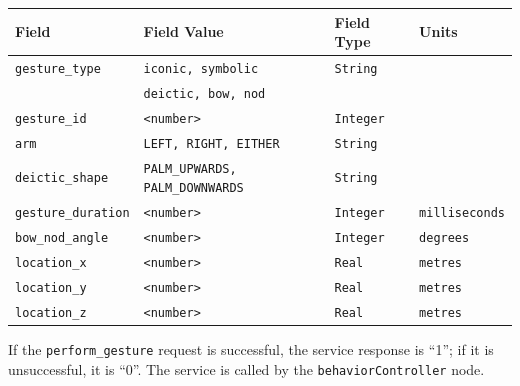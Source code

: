 \documentclass{CSSRforAfrica}
\begin{document}
{{\begin{center}
\begin{tabularx}{\linewidth}{| l | X | l | l |}
\hline 
{\small Field }                               & {\small Field Value }                            &  {\small Field Type}   &  {\small Units}    \\
\hline
{\footnotesize \verb+gesture_type+}  & {\footnotesize \texttt{iconic, symbolic}}    & {\footnotesize \texttt{String}} & {\footnotesize } \\ 
{\footnotesize }  & {\footnotesize \texttt{deictic, bow, nod}}    & {\footnotesize } & {\footnotesize } \\ 
\hline
{\footnotesize \verb+gesture_id+}  & {\footnotesize \texttt{<number>}}    & {\footnotesize \texttt{Integer}} & {\footnotesize } \\ 
\hline
{\footnotesize \verb+arm+}  & {\footnotesize \texttt{LEFT, RIGHT, EITHER}}    & {\footnotesize \texttt{String}} & {\footnotesize } \\ 
\hline
{\footnotesize \verb+deictic_shape+}  & {\footnotesize \texttt{PALM\_UPWARDS, PALM\_DOWNWARDS}}    & {\footnotesize \texttt{String}} & {\footnotesize } \\ 
\hline
{\footnotesize \verb+gesture_duration+}  & {\footnotesize \texttt{<number>}}    & {\footnotesize \texttt{Integer}} & {\footnotesize \texttt{milliseconds}} \\ 
\hline
{\footnotesize \verb+bow_nod_angle+}  & {\footnotesize \texttt{<number>}}    & {\footnotesize \texttt{Integer}} & {\footnotesize \texttt{degrees}} \\ 
\hline
{\footnotesize \verb+location_x+}  & {\footnotesize \texttt{<number>}}    & {\footnotesize \texttt{Real}} & {\footnotesize \texttt{metres}} \\ 
\hline
{\footnotesize \verb+location_y+}  & {\footnotesize \texttt{<number>}}    & {\footnotesize \texttt{Real}} & {\footnotesize \texttt{metres}} \\ 
\hline
{\footnotesize \verb+location_z+}  & {\footnotesize \texttt{<number>}}    & {\footnotesize \texttt{Real}} & {\footnotesize \texttt{metres}} \\ 
\hline
\end{tabularx}
\end{center}

If the {\small \verb+perform_gesture+} request is successful, the service response is ``1''; if it is unsuccessful, it is ``0''.  
The service  is called by  the {\small \verb+behaviorController+} node.
 
}}
\end{document}
